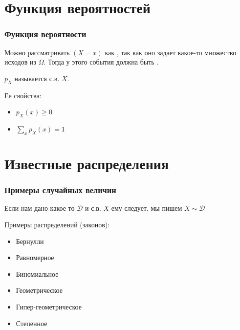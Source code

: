 \documentclass[hyperref=unicode,graphics=pdflatex,13pt,xcolor={usenames,dvipsnames}]{beamer}
\renewcommand\emph[1]{{\color{blue}{#1}}}
\begin{document}
\section{Функция вероятностей}
\begin{frame}
  \frametitle{Функция вероятности}

  Можно рассматривать $(X = x)$ как \emph{событие}, так как оно задает какое-то множество исходов из $\Omega$. Тогда у этого события должна быть \emph{вероятность}.
  
  \pause

  \begin{center}
  \end{center}

  $p_X$ называется \emph{функцией вероятности} с.в. $X$.

  \pause
  Ее свойства:
  \begin{itemize}
    \item $p_X(x) \ge 0$
    \item $\sum_x p_X(x) = 1$
  \end{itemize}
\end{frame}

\section{Известные распределения}
\begin{frame}
  \frametitle{Примеры случайных величин}
  Если нам дано какое-то \emph{распределение} $\mathcal{D}$ и с.в. $X$ ему следует, мы пишем $X \sim \mathcal{D}$ 

  Примеры распределений (законов):
  \begin{itemize}
    \item Бернулли
    \item Равномерное
    \item Биномиальное
    \item Геометрическое
    \item Гипер-геометрическое
    \item Степенное
  \end{itemize}
\end{frame}
\end{document}
